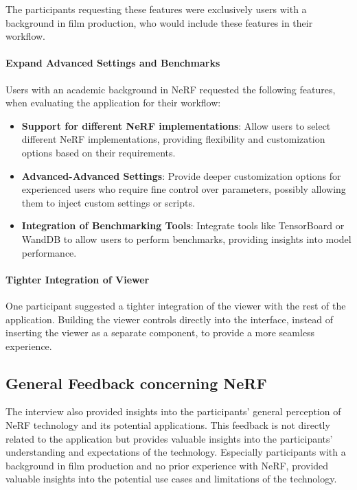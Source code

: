 The participants requesting these features were exclusively users with a background in film production, who would include these features in their workflow.

\paragraph{Expand Advanced Settings and Benchmarks}
Users with an academic background in NeRF requested the following features, when evaluating the application for their workflow:

\begin{itemize}
  \item \textbf{Support for different NeRF implementations}: Allow users to select different NeRF implementations, providing flexibility and customization options based on their requirements. 
  \cite{P1}
  \item \textbf{Advanced-Advanced Settings}: Provide deeper customization options for experienced users who require fine control over parameters, possibly allowing them to inject custom settings or scripts.
  \cite{P9}
  \item \textbf{Integration of Benchmarking Tools}: Integrate tools like TensorBoard or WandDB to allow users to perform benchmarks, providing insights into model performance.
  \cite{P10}
\end{itemize}



\paragraph{Tighter Integration of Viewer}
One participant suggested a tighter integration of the viewer with the rest of the application.
Building the viewer controls directly into the interface, instead of inserting the viewer as a separate component, to provide a more seamless experience.
\cite{P9}

\subsection*{General Feedback concerning NeRF}

The interview also provided insights into the participants' general perception of NeRF technology and its potential applications.
This feedback is not directly related to the application but provides valuable insights into the participants' understanding and expectations of the technology.
Especially participants with a background in film production and no prior experience with NeRF, provided valuable insights into the potential use cases and limitations of the technology.

